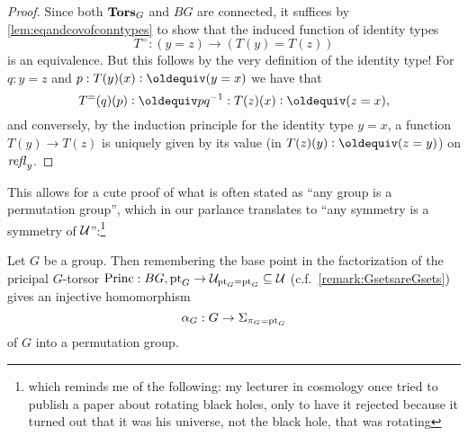 \begin{proof}
  Since both $\mathbf{Tors}_G$ and $BG$ are connected, it suffices by \cref{lem:eqandcovofconntypes} to show that the induced function of identity types
$$T^=:(y=z)\to(T(y)= T(z))
$$
is an equivalence.  But this follows by the very definition of the identity type!  For $q:y=z$ and $p:T(y)(x)\defequi(y=x)$ we have that 
$$T^=(q)(p)\defequi pq^{-1}:T(z)(x)\defequi(z=x),$$ and conversely, by the induction principle for the identity type $%
y=x$,  a function $T(y)\to T(z)$ is uniquely given by its value (in $T(z)(y)\defequi (z=y)$) on $\mathop{{\it refl}_{y}}$.
\end{proof}
This allows for a cute proof of what is often stated as ``any group is a permutation group'', which in our parlance translates to ``any symmetry is a symmetry of $\mathcal{U}$'':\footnote{which reminds me of the following: my lecturer in cosmology once tried to publish a paper about rotating black holes, only to have it rejected because it turned out that it was his universe, not the black hole, that was rotating}
\begin{lemma}
  \label{lem:allgpsarepermutationgps}Let $G$ be a group.  Then remembering the base point in the factorization of the pricipal $G$-torsor $\mathrm{Princ}:BG,{\mathord{\mathrm{pt}}}_G\to \mathcal{U}_{{\mathord{\mathrm{pt}}}_G={\mathord{\mathrm{pt}}}_G}\subseteq\mathcal{U}$ (c.f.~\cref{remark:GsetsareGsets}) gives an injective homomorphism
$$\alpha_G:G\to\Sigma_{\pi_G={\mathord{\mathrm{pt}}}_G}$$  
of $G$ into a permutation group.
\end{lemma}
